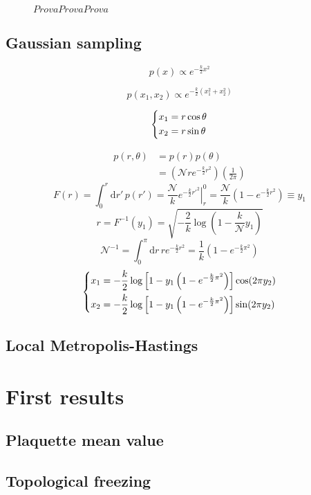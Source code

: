 \begin{figure}[!htb]
    \centering
    
    \caption{$ProvaProvaProva$}
    \label{fig:gauss}
\end{figure}

\subsection*{Gaussian sampling}
\[
    p(x) \propto e^{-\frac{k}{2}x^2}
\]

\[
    p(x_1,x_2) \propto e^{-\frac{k}{2}(x_1^2+x_2^2)}
\]

\[\begin{dcases}
    x_1 = r \cos\theta \\
    x_2 = r \sin\theta \\
\end{dcases}\]

\[\begin{aligned}
    p(r,\theta) &= p(r)p(\theta) \\
                &= \left(\mathcal Nre^{-\frac{k}{2}r^2}\right)\left(\frac{1}{2\pi}\right)
\end{aligned}\]
\[
    F(r) = \int_0^r\mathrm dr'\,p(r') = \frac{\mathcal N}{k}\left.e^{-\frac{k}{2}{r'}^2}\right|_r^0 = \frac{\mathcal N}{k}\left(1-e^{-\frac{k}{2}r^2}\right) \equiv y_1
\]
\[
    r = F^{-1}(y_1) = \sqrt{-\frac{2}{k}\log\left(1-\frac{k}{\mathcal N}y_1\right)}
\]
\[
    \mathcal N^{-1} = \int_0^\pi\mathrm dr\,re^{-\frac{k}{2}r^2} = \frac{1}{k}\left(1-e^{-\frac{k}{2}\pi^2}\right)
\]
\begin{equation*}
    \begin{dcases}
        x_1 = -\frac{k}{2}\log\left[1-y_1\left(1-e^{-\frac{k}{2}\pi^2}\right)\right]\cos(2\pi y_2) \\
        x_2 = -\frac{k}{2}\log\left[1-y_1\left(1-e^{-\frac{k}{2}\pi^2}\right)\right]\sin(2\pi y_2)
    \end{dcases}
\end{equation*}

\subsection{Local Metropolis-Hastings}

\section{First results}

\subsection{Plaquette mean value}

\subsection{Topological freezing}

